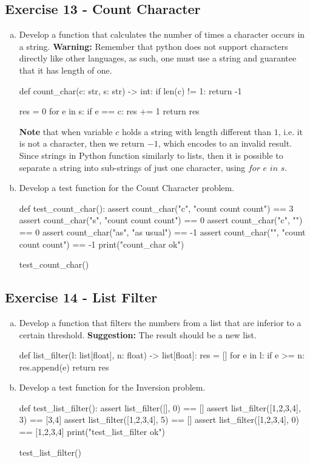 \documentclass[12pt]{article}
\begin{document}
\subsection*{Exercise 13 - Count Character}
\begin{enumerate}[a)]
  \item Develop a function that calculates the number of times a character
    occurs in a string. \textbf{Warning:} Remember that python does not support 
    characters directly like other languages, as such, one must use a string and 
    guarantee that it has length of one.
\begin{pythonlst}
def count_char(c: str, s: str) -> int:
  if len(c) != 1:
    return -1
  
  res = 0
  for e in s:
    if e == c:
      res += 1
  return res
\end{pythonlst}
\textbf{Note} that when variable $c$ holds a string with length different than
$1$, i.e. it is not a character, then we return $-1$, which encodes to an invalid
result. Since strings in Python function similarly to lists, then it is possible
to separate a string into sub-strings of just one character, using $\textit{for }
e \textit{ in } s$.
  \item Develop a test function for the Count Character problem.
\begin{pythonlst}
def test_count_char():
  assert count_char("c", "count count count") == 3
  assert count_char("s", "count count count") == 0
  assert count_char("c", "") == 0
  assert count_char("as", "as usual") == -1
  assert count_char("", "count count count") == -1
  print("count_char ok")

test_count_char()
\end{pythonlst}
\vspace{-4mm}
\end{enumerate}

\subsection*{Exercise 14 - List Filter}
\begin{enumerate}[a)]
  \item Develop a function that filters the numbers from a list that are 
    inferior to a certain threshold. \textbf{Suggestion:} The result should be a 
    new list.
\begin{pythonlst}
def list_filter(l: list[float], n: float) -> list[float]:
  res = []
  for e in l:
    if e >= n:
      res.append(e)
  return res
\end{pythonlst}
\vspace{-4mm}
  \item Develop a test function for the Inversion problem.
\begin{pythonlst}
def test_list_filter():
  assert list_filter([], 0) == []
  assert list_filter([1,2,3,4], 3) == [3,4]
  assert list_filter([1,2,3,4], 5) == []
  assert list_filter([1,2,3,4], 0) == [1,2,3,4]
  print("test_list_filter ok")

test_list_filter()
\end{pythonlst}
\end{enumerate}
\end{document}
